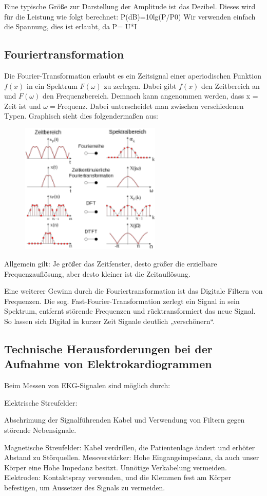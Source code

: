 Eine typische Größe zur Darstellung der Amplitude ist das Dezibel. Dieses wird für die Leistung wie folgt berechnet:
P(dB)=10lg(P/P0)
Wir verwenden einfach die Spannung, dies ist erlaubt, da P= U*I

\subsection{Fouriertransformation }
Die Fourier-Transformation erlaubt es ein Zeitsignal einer aperiodischen Funktion $f(x)$ in ein Spektrum $F(\omega)$ zu zerlegen. Dabei gibt $f(x)$ den Zeitbereich an und $F(\omega)$ den Frequenzbereich. Demnach kann angenommen werden, dass x = Zeit ist und $\omega= $Frequenz. 
Dabei unterscheidet man zwischen verschiedenen Typen. Graphisch sieht dies folgendermaßen aus:
\begin{figure}[H]
     \centering
     \includegraphics[width=0.6\textwidth]{Abb/fourier.pdf}
\end{figure}
Allgemein gilt: Je größer das Zeitfenster, desto größer die erzielbare Frequenzauflösung, aber desto kleiner ist die Zeitauflösung.

Eine weiterer Gewinn durch die Fouriertransformation ist das Digitale Filtern von Frequenzen. Die sog. Fast-Fourier-Transformation zerlegt ein Signal in sein Spektrum, entfernt störende Frequenzen und rücktransformiert das neue Signal. So lassen sich Digital in kurzer Zeit Signale deutlich „verschönern“.

\subsection{Technische Herausforderungen bei der Aufnahme von Elektrokardiogrammen}
Beim Messen von EKG-Signalen sind möglich durch:

Elektrische Streufelder:

Abschrimung der Signalführenden Kabel und Verwendung von Filtern gegen störende Nebensignale.

Magnetische Streufelder:
     Kabel verdrillen, die Patientenlage ändert und erhöter Abstand zu Störquellen.
Messverstärker:
Hohe Eingangsimpedanz, da auch unser Körper eine Hohe Impedanz besitzt. Unnötige Verkabelung vermeiden.
Elektroden:
Kontaktspray verwenden, und die Klemmen fest am Körper befestigen, um Aussetzer des Signals zu vermeiden.